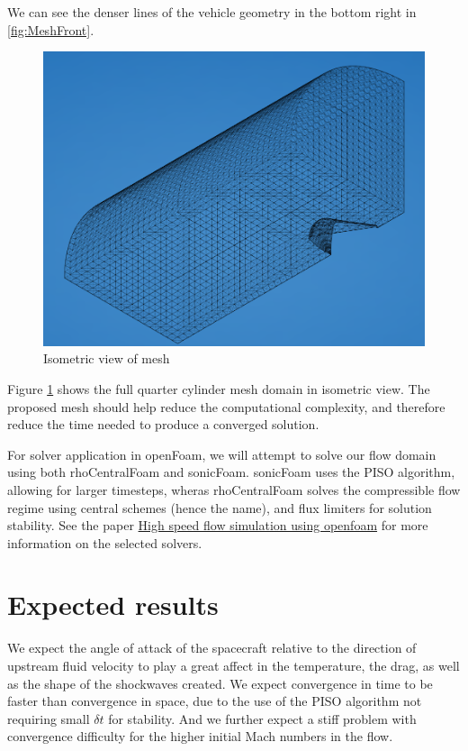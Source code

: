 \documentclass[10pt, oneside,english]{article}
\begin{document}
We can see the denser lines of the vehicle geometry in the bottom right in \ref{fig:MeshFront}.

\begin{figure}[h!]
    \centering
    \includegraphics[width=0.5\linewidth]{figures/isometric_mesh}
    \caption{Isometric view of mesh}
    \label{fig:MeshIso}
\end{figure}   

Figure \ref{fig:MeshIso} shows the full quarter cylinder mesh domain in isometric view. The proposed mesh should help reduce the computational complexity, and therefore reduce the time needed to produce a converged solution.

For solver application in openFoam, we will attempt to solve our flow domain using both rhoCentralFoam and sonicFoam. sonicFoam uses the PISO algorithm, allowing for larger timesteps, wheras rhoCentralFoam solves the compressible flow regime using central schemes (hence the name), and flux limiters for solution stability. See the paper \href{https://cimec.org.ar/ojs/index.php/mc/article/viewFile/4231/4157}{High speed flow simulation using openfoam} for more information on the selected solvers. 

\section{Expected results}
We expect the angle of attack of the spacecraft relative to the direction of upstream fluid velocity to play a great affect in the temperature, the drag, as well as the shape of the shockwaves created. We expect convergence in time to be faster than convergence in space, due to the use of the PISO algorithm not requiring small $\delta t$ for stability. And we further expect a stiff problem with convergence difficulty for the higher initial Mach numbers in the flow. 
\end{document}
